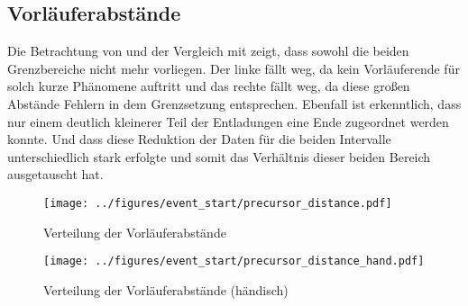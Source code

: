 \subsection{Vorläuferabstände}
\label{sec:precursor_distance_target}
Die Betrachtung von  und der Vergleich mit  zeigt, dass sowohl die beiden Grenzbereiche nicht mehr vorliegen. Der linke fällt weg, da kein Vorläuferende für solch kurze Phänomene auftritt und das rechte fällt weg, da diese großen Abstände Fehlern in dem Grenzsetzung entsprechen. Ebenfall ist erkenntlich, dass nur einem deutlich kleinerer Teil der Entladungen eine Ende zugeordnet werden konnte. Und dass diese Reduktion der Daten für die beiden Intervalle unterschiedlich stark erfolgte und somit das Verhältnis dieser beiden Bereich ausgetauscht hat.


\begin{figure}[htbp]
    \centering
    \begin{minipage}[t]{0.47\textwidth}
      \centering
      \texttt{[image: ../figures/event\_start/precursor\_distance.pdf]}
      \caption{Verteilung der Vorläuferabstände}
      \label{fig:histogram-precdistance}
   \end{minipage}
 \begin{minipage}[t]{0.47\textwidth}
      \centering
      \texttt{[image: ../figures/event\_start/precursor\_distance\_hand.pdf]}
      \caption{Verteilung der Vorläuferabstände (händisch)}
      \label{fig:histogram-precdistance-hand}
  \end{minipage}
\end{figure}

